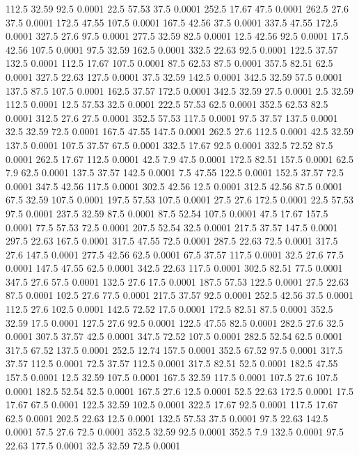 112.5	32.59	92.5	0.0001
22.5	57.53	37.5	0.0001
252.5	17.67	47.5	0.0001
262.5	27.6	37.5	0.0001
172.5	47.55	107.5	0.0001
167.5	42.56	37.5	0.0001
337.5	47.55	172.5	0.0001
327.5	27.6	97.5	0.0001
277.5	32.59	82.5	0.0001
12.5	42.56	92.5	0.0001
17.5	42.56	107.5	0.0001
97.5	32.59	162.5	0.0001
332.5	22.63	92.5	0.0001
122.5	37.57	132.5	0.0001
112.5	17.67	107.5	0.0001
87.5	62.53	87.5	0.0001
357.5	82.51	62.5	0.0001
327.5	22.63	127.5	0.0001
37.5	32.59	142.5	0.0001
342.5	32.59	57.5	0.0001
137.5	87.5	107.5	0.0001
162.5	37.57	172.5	0.0001
342.5	32.59	27.5	0.0001
2.5	32.59	112.5	0.0001
12.5	57.53	32.5	0.0001
222.5	57.53	62.5	0.0001
352.5	62.53	82.5	0.0001
312.5	27.6	27.5	0.0001
352.5	57.53	117.5	0.0001
97.5	37.57	137.5	0.0001
32.5	32.59	72.5	0.0001
167.5	47.55	147.5	0.0001
262.5	27.6	112.5	0.0001
42.5	32.59	137.5	0.0001
107.5	37.57	67.5	0.0001
332.5	17.67	92.5	0.0001
332.5	72.52	87.5	0.0001
262.5	17.67	112.5	0.0001
42.5	7.9	47.5	0.0001
172.5	82.51	157.5	0.0001
62.5	7.9	62.5	0.0001
137.5	37.57	142.5	0.0001
7.5	47.55	122.5	0.0001
152.5	37.57	72.5	0.0001
347.5	42.56	117.5	0.0001
302.5	42.56	12.5	0.0001
312.5	42.56	87.5	0.0001
67.5	32.59	107.5	0.0001
197.5	57.53	107.5	0.0001
27.5	27.6	172.5	0.0001
22.5	57.53	97.5	0.0001
237.5	32.59	87.5	0.0001
87.5	52.54	107.5	0.0001
47.5	17.67	157.5	0.0001
77.5	57.53	72.5	0.0001
207.5	52.54	32.5	0.0001
217.5	37.57	147.5	0.0001
297.5	22.63	167.5	0.0001
317.5	47.55	72.5	0.0001
287.5	22.63	72.5	0.0001
317.5	27.6	147.5	0.0001
277.5	42.56	62.5	0.0001
67.5	37.57	117.5	0.0001
32.5	27.6	77.5	0.0001
147.5	47.55	62.5	0.0001
342.5	22.63	117.5	0.0001
302.5	82.51	77.5	0.0001
347.5	27.6	57.5	0.0001
132.5	27.6	17.5	0.0001
187.5	57.53	122.5	0.0001
27.5	22.63	87.5	0.0001
102.5	27.6	77.5	0.0001
217.5	37.57	92.5	0.0001
252.5	42.56	37.5	0.0001
112.5	27.6	102.5	0.0001
142.5	72.52	17.5	0.0001
172.5	82.51	87.5	0.0001
352.5	32.59	17.5	0.0001
127.5	27.6	92.5	0.0001
122.5	47.55	82.5	0.0001
282.5	27.6	32.5	0.0001
307.5	37.57	42.5	0.0001
347.5	72.52	107.5	0.0001
282.5	52.54	62.5	0.0001
317.5	67.52	137.5	0.0001
252.5	12.74	157.5	0.0001
352.5	67.52	97.5	0.0001
317.5	37.57	112.5	0.0001
72.5	37.57	112.5	0.0001
317.5	82.51	52.5	0.0001
182.5	47.55	157.5	0.0001
12.5	32.59	107.5	0.0001
167.5	32.59	117.5	0.0001
107.5	27.6	107.5	0.0001
182.5	52.54	52.5	0.0001
167.5	27.6	12.5	0.0001
52.5	22.63	172.5	0.0001
17.5	17.67	67.5	0.0001
122.5	32.59	102.5	0.0001
322.5	17.67	92.5	0.0001
117.5	17.67	62.5	0.0001
202.5	22.63	12.5	0.0001
132.5	57.53	37.5	0.0001
97.5	22.63	142.5	0.0001
57.5	27.6	72.5	0.0001
352.5	32.59	92.5	0.0001
352.5	7.9	132.5	0.0001
97.5	22.63	177.5	0.0001
32.5	32.59	72.5	0.0001
